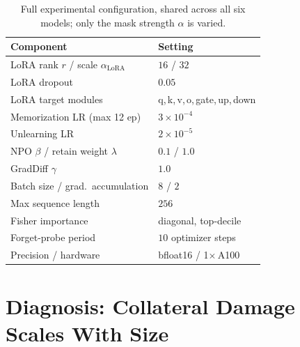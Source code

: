 \documentclass[sigconf,nonacm]{acmart}
\begin{document}
\begin{table}[t]
\centering
\caption{Full experimental configuration, shared across all six models; only the mask strength $\alpha$ is varied.}
\label{tab:config}
\small
\begin{tabular}{ll}
\toprule
\rowcolor{hiA} \textbf{Component} & \textbf{Setting} \\
\midrule
LoRA rank $r$ / scale $\alpha_{\text{LoRA}}$ & $16$ / $32$ \\
\rowcolor{hiB} LoRA dropout & $0.05$ \\
LoRA target modules & q,\,k,\,v,\,o,\,gate,\,up,\,down \\
\rowcolor{hiB} Memorization LR (max 12 ep) & $3{\times}10^{-4}$ \\
Unlearning LR & $2{\times}10^{-5}$ \\
\rowcolor{hiB} NPO $\beta$ / retain weight $\lambda$ & $0.1$ / $1.0$ \\
GradDiff $\gamma$ & $1.0$ \\
\rowcolor{hiB} Batch size / grad.\ accumulation & $8$ / $2$ \\
Max sequence length & $256$ \\
\rowcolor{hiB} Fisher importance & diagonal, top-decile \\
Forget-probe period & $10$ optimizer steps \\
\rowcolor{hiB} Precision / hardware & bfloat16 / 1$\times$\,A100 \\
\bottomrule
\end{tabular}
\end{table}

\section{Diagnosis: Collateral Damage Scales With Size}
\label{sec:diagnosis}
\end{document}
